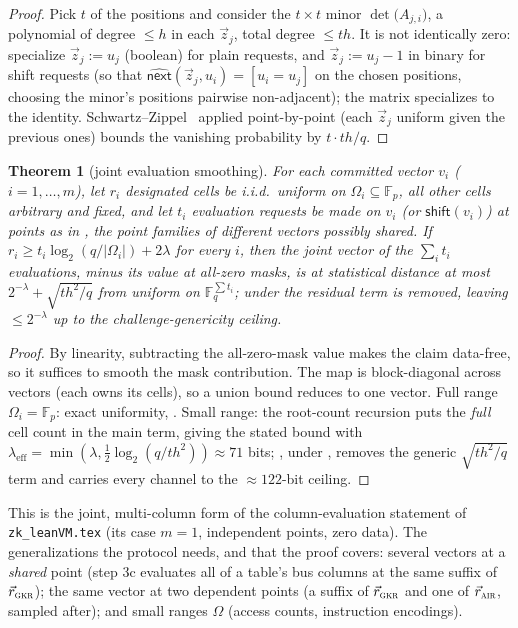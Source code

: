 \documentclass{article}
\newcommand{\Fp}{\mathbb{F}_p}
\newcommand{\Fq}{\mathbb{F}_q}
\newtheorem{theorem}{Theorem}[section]
\theoremstyle{definition}
\begin{document}
\begin{proof}
Pick $t$ of the positions and consider the $t \times t$ minor $\det\big(A_{j,i}\big)$, a polynomial of degree $\leq h$ in each $\vec z_j$, total degree $\leq th$. It is not identically zero: specialize $\vec z_j := u_j$ (boolean) for plain requests, and $\vec z_j := u_j - 1$ in binary for shift requests (so that $\widehat{\mathsf{next}}(\vec z_j, u_i) = [u_i = u_j]$ on the chosen positions, choosing the minor's positions pairwise non-adjacent); the matrix specializes to the identity. Schwartz--Zippel~\cite{schwartz_zippel} applied point-by-point (each $\vec z_j$ uniform given the previous ones) bounds the vanishing probability by $t \cdot th/q$.
\end{proof}

\begin{theorem}[joint evaluation smoothing]\label{conj:linear}
For each committed vector $v_i$ ($i = 1, \dots, m$), let $r_i$ designated cells be i.i.d.\ uniform on $\Omega_i \subseteq \Fp$, all other cells \emph{arbitrary and fixed}, and let $t_i$ evaluation requests be made on $v_i$ (or $\mathsf{shift}(v_i)$) at points as in , the point families of different vectors possibly shared. If $r_i \geq t_i \log_2(q / |\Omega_i|) + 2\lambda$ for every $i$, then the joint vector of the $\sum_i t_i$ evaluations, \emph{minus its value at all-zero masks}, is at statistical distance at most $2^{-\lambda} + \sqrt{t h^2/q}$ from uniform on $\Fq^{\sum t_i}$; under  the residual term is removed, leaving $\leq 2^{-\lambda}$ up to the challenge-genericity ceiling.
\end{theorem}

\begin{proof}
By linearity, subtracting the all-zero-mask value makes the claim data-free, so it suffices to smooth the mask contribution. The map is block-diagonal across vectors (each owns its cells), so a union bound reduces to one vector. Full range $\Omega_i = \Fp$: exact uniformity, . Small range: the root-count recursion  puts the \emph{full} cell count in the main term, giving the stated bound with $\lambda_{\mathrm{eff}} = \min(\lambda, \tfrac12\log_2(q/t h^2)) \approx 71$ bits; , under , removes the generic $\sqrt{t h^2/q}$ term and carries every channel to the $\approx 122$-bit ceiling.
\end{proof}

This is the joint, multi-column form of the column-evaluation statement of \texttt{zk\_leanVM.tex} (its case $m = 1$, independent points, zero data). The generalizations the protocol needs, and that the proof covers: several vectors at a \emph{shared} point (step 3c evaluates all of a table's bus columns at the same suffix of $\vec r_\textsc{gkr}$); the same vector at two dependent points (a suffix of $\vec r_\textsc{gkr}$ and one of $\vec r_\textsc{air}$, sampled after); and small ranges $\Omega$ (access counts, instruction encodings).
\end{document}
